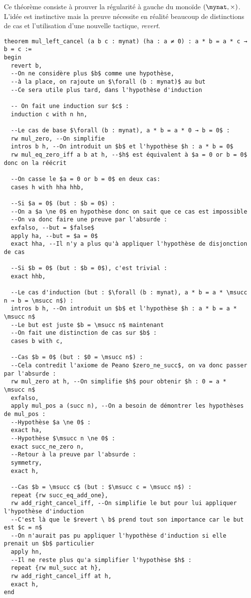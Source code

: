 Ce théorème consiste à prouver la régularité à gauche du monoïde $(\mynat, \times)$.
L'idée est instinctive mais la preuve nécessite en réalité beaucoup de distinctions de cas et l'utilisation d'une nouvelle tactique, \textit{revert}.
\begin{verbatim}
theorem mul_left_cancel (a b c : mynat) (ha : a ≠ 0) : a * b = a * c → b = c :=
begin
  revert b,
  --On ne considère plus $b$ comme une hypothèse,
  --à la place, on rajoute un $\forall (b : mynat)$ au but
  --Ce sera utile plus tard, dans l'hypothèse d'induction
  
  -- On fait une induction sur $c$ :
  induction c with n hn,

  --Le cas de base $\forall (b : mynat), a * b = a * 0 → b = 0$ :
  rw mul_zero, --On simplifie
  intros b h, --On introduit un $b$ et l'hypothèse $h : a * b = 0$
  rw mul_eq_zero_iff a b at h, --$h$ est équivalent à $a = 0 or b = 0$ donc on la réécrit
  
  --On casse le $a = 0 or b = 0$ en deux cas:
  cases h with hha hhb,
  
  --Si $a = 0$ (but : $b = 0$) :
  --On a $a \ne 0$ en hypothèse donc on sait que ce cas est impossible
  --On va donc faire une preuve par l'absurde :
  exfalso, --but = $false$
  apply ha, --but = $a = 0$
  exact hha, --Il n'y a plus qu'à appliquer l'hypothèse de disjonction de cas
  
  --Si $b = 0$ (but : $b = 0$), c'est trivial :
  exact hhb,

  --Le cas d'induction (but : $\forall (b : mynat), a * b = a * \msucc n → b = \msucc n$) :
  intros b h, --On introduit un $b$ et l'hypothèse $h : a * b = a * \msucc n$
  --Le but est juste $b = \msucc n$ maintenant
  --On fait une distinction de cas sur $b$ :
  cases b with c,

  --Cas $b = 0$ (but : $0 = \msucc n$) :
  --Cela contredit l'axiome de Peano $zero_ne_succ$, on va donc passer par l'absurde :
  rw mul_zero at h, --On simplifie $h$ pour obtenir $h : 0 = a * \msucc n$
  exfalso,
  apply mul_pos a (succ n), --On a besoin de démontrer les hypothèses de mul_pos :
  --Hypothèse $a \ne 0$ :
  exact ha,
  --Hypothèse $\msucc n \ne 0$ :
  exact succ_ne_zero n,
  --Retour à la preuve par l'absurde :
  symmetry,
  exact h,

  --Cas $b = \msucc c$ (but : $\msucc c = \msucc n$) :
  repeat {rw succ_eq_add_one},
  rw add_right_cancel_iff, --On simplifie le but pour lui appliquer l'hypothèse d'induction
  --C'est là que le $revert \ b$ prend tout son importance car le but est $c = n$
  --On n'aurait pas pu appliquer l'hypothèse d'induction si elle prenait un $b$ particulier
  apply hn,
  --Il ne reste plus qu'a simplifier l'hypothèse $h$ :
  repeat {rw mul_succ at h},
  rw add_right_cancel_iff at h,
  exact h,
end
\end{verbatim}

